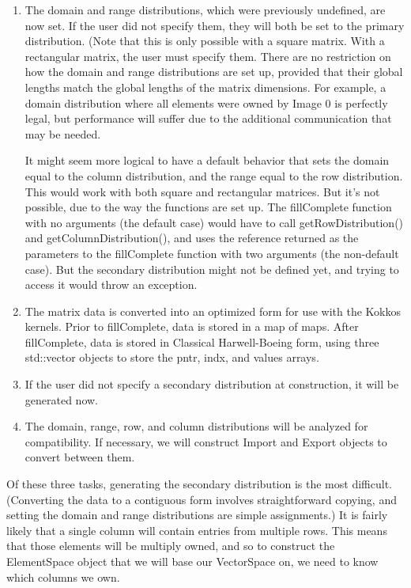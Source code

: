 \documentclass[10pt,relax]{TpetraDesign}
\begin{document}
\begin{enumerate}
\item The domain and range distributions, which were previously undefined, are now set. If the user did not specify them, they will both be set to the primary distribution. (Note that this is only possible with a square matrix. With a rectangular matrix, the user must specify them. There are no restriction on how the domain and range distributions are set up, provided that their global lengths match the global lengths of the matrix dimensions. For example, a domain distribution where all elements were owned by Image 0 is perfectly legal, but performance will suffer due to the additional communication that may be needed.

It might seem more logical to have a default behavior that sets the domain equal to the column distribution, and the range equal to the row distribution. This would work with both square and rectangular matrices. But it's not possible, due to the way the functions are set up. The fillComplete function with no arguments (the default case) would have to call getRowDistribution() and getColumnDistribution(), and uses the reference returned as the parameters to the fillComplete function with two arguments (the non-default case). But the secondary distribution might not be defined yet, and trying to access it would throw an exception.

\item The matrix data is converted into an optimized form for use with the Kokkos kernels. Prior to fillComplete, data is stored in a map of maps. After fillComplete, data is stored in Classical Harwell-Boeing form, using three std::vector objects to store the pntr, indx, and values arrays. 


\item If the user did not specify a secondary distribution at construction, it will be generated now.

\item The domain, range, row, and column distributions will be analyzed for compatibility. If necessary, we will construct Import and Export objects to convert between them.
\end{enumerate}

Of these three tasks, generating the secondary distribution is the most difficult. (Converting the data to a contiguous form involves straightforward copying, and setting the domain and range distributions are simple assignments.) It is fairly likely that a single column will contain entries from multiple rows. This means that those elements will be multiply owned, and so to construct the ElementSpace object that we will base our VectorSpace on, we need to know which columns we own. 
\end{document}
